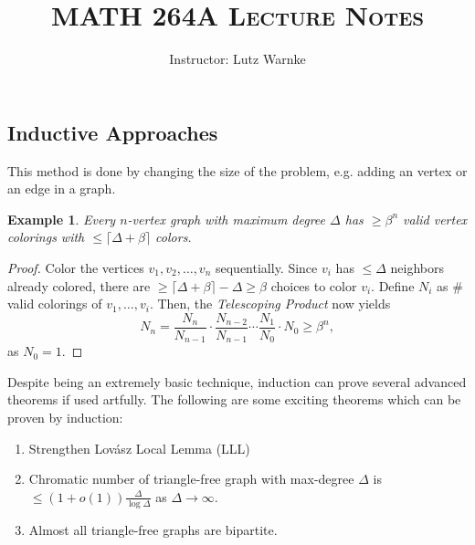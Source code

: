 \documentclass[a4paper]{article}
\title{\textsc{MATH 264A Lecture Notes}}
\author{Instructor: Lutz Warnke}
\date{}
\newtheorem{example}[theorem]{Example}
\begin{document}
\begin{center}
\end{center}
\subsection*{Inductive Approaches}

This method is done by changing the size of the problem, e.g. adding an vertex or an edge in a graph.

\begin{example}
  Every $n$-vertex graph with maximum degree $\Delta$ has $\geq \beta^n$ valid vertex colorings with $\leq \lceil \Delta + \beta \rceil$ colors.
\end{example}

\begin{proof}
  Color the vertices $v_1, v_2, \ldots, v_n$ sequentially. Since $v_i$ has $\leq \Delta$ neighbors already colored, there are $\geq \lceil \Delta + \beta \rceil - \Delta \geq \beta$ choices to color $v_i$. Define $N_i$ as $\#$ valid colorings of $v_1, \ldots, v_i$. Then, the \textit{Telescoping Product} now yields
  \[
    N_n = \frac{N_n}{N_{n - 1}} \cdot \frac{N_{n - 2}}{N_{n - 1}} \cdots \frac{N_{1}}{N_{0}} \cdot N_0 \geq \beta^n,
  \]
  as $N_0 = 1$.
\end{proof}

Despite being an extremely basic technique, induction can prove several advanced theorems if used artfully. The following are some exciting theorems which can be proven by induction:

\begin{enumerate}
  \item Strengthen Lovász Local Lemma (LLL)
  \item Chromatic number of triangle-free graph with max-degree $\Delta$ is $\leq (1 + o(1))\frac{\Delta}{\log \Delta}$ as $\Delta \to \infty$.
  \item Almost all triangle-free graphs are bipartite.
\end{enumerate}
\end{document}
